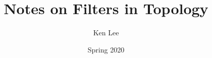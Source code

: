 \documentclass{article}
\begin{document}
\title{Notes on Filters in Topology}

\author{Ken Lee}
\date{Spring 2020}
\maketitle

\tableofcontents





\end{document}
